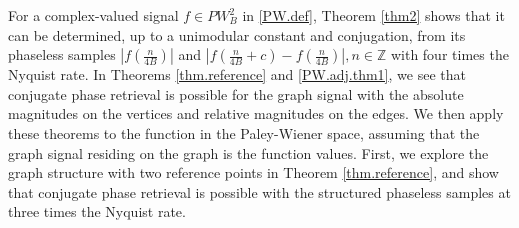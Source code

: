 \documentclass[12pt,oneside,reqno]{amsart}
\newcommand{\Z}{\mathbb{Z}}
\newcommand{\R}{\mathbb{R}}
\numberwithin{equation}{section}
\begin{document}
For a complex-valued signal  $f\in PW_{B}^2$ in \eqref{PW.def}, Theorem \ref{thm2} shows that it can be determined, up to a unimodular constant and conjugation, from its phaseless samples  $ |f(\frac{n}{4B})|$ and  $ |f(\frac{n}{4B} + c)-f(\frac{n}{4B})|, n\in \Z $ with four times the Nyquist rate.   In Theorems \ref{thm.reference} and \ref{PW.adj.thm1}, we see that conjugate phase retrieval  is possible for the graph signal with the absolute magnitudes on the vertices and relative magnitudes on the edges. We then apply these theorems to the function in the Paley-Wiener space, assuming that the graph signal residing on the graph is the function values. First, we explore the graph structure with two reference points in Theorem \ref{thm.reference}, and show that conjugate phase retrieval is possible with the structured phaseless samples at three times the Nyquist rate.
%
\end{document}
